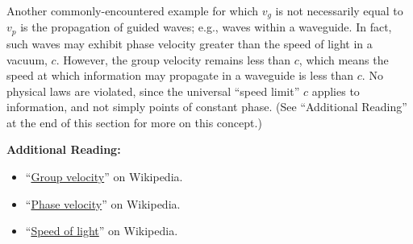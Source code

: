 Another commonly-encountered example for which $v_g$ is not necessarily equal to $v_p$ is the propagation of guided waves; e.g., waves within a waveguide.
In fact, such waves may exhibit phase velocity greater than the speed of light in a vacuum, $c$. 
However, the group velocity remains less than $c$, which means the speed at which information may propagate in a waveguide is less than $c$.
No physical laws are violated, since the universal ``speed limit'' $c$ applies to information, and not simply points of constant phase.
(See ``Additional Reading'' at the end of this section for more on this concept.)


{\bf Additional Reading:}
\begin{itemize}
\item ``\href{https://en.wikipedia.org/wiki/Group_velocity}{Group velocity}'' on Wikipedia.
\item ``\href{https://en.wikipedia.org/wiki/Phase_velocity}{Phase velocity}'' on Wikipedia.
\item ``\href{https://en.wikipedia.org/wiki/Speed_of_light}{Speed of light}'' on Wikipedia.
\end{itemize}



